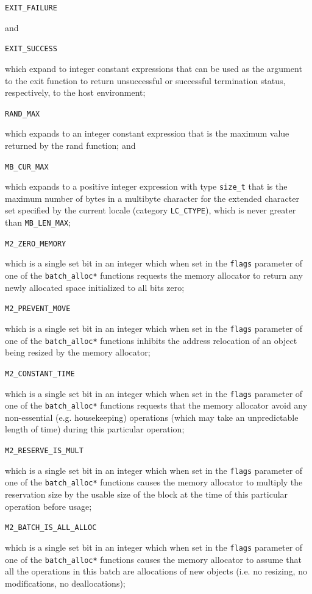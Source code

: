 \documentclass[wd]{isov2}
\begin{document}
{\begin{enumerate}
\texttt{EXIT\_FAILURE}

and

\texttt{EXIT\_SUCCESS}

which expand to integer constant expressions that can be used as the argument to the exit function to return unsuccessful or successful termination status, respectively, to the host environment;

\texttt{RAND\_MAX}

which expands to an integer constant expression that is the maximum value returned by the rand function; and

\texttt{MB\_CUR\_MAX}

which expands to a positive integer expression with type \texttt{size\_t} that is the maximum number of bytes in a multibyte character for the extended character set specified by the current locale (category \texttt{LC\_CTYPE}), which is never greater than \texttt{MB\_LEN\_MAX}\color{changed};

\texttt{M2\_ZERO\_MEMORY}

which is a single set bit in an integer which when set in the \texttt{flags} parameter of one of the \texttt{batch\_alloc*} functions requests the memory allocator to return any newly allocated space initialized to all bits zero;

\texttt{M2\_PREVENT\_MOVE}

which is a single set bit in an integer which when set in the \texttt{flags} parameter of one of the \texttt{batch\_alloc*} functions inhibits the address relocation of an object being resized by the memory allocator;

\texttt{M2\_CONSTANT\_TIME}

which is a single set bit in an integer which when set in the \texttt{flags} parameter of one of the \texttt{batch\_alloc*} functions requests that the memory allocator avoid any non-essential (e.g. housekeeping) operations (which may take an unpredictable length of time) during this particular operation;

\texttt{M2\_RESERVE\_IS\_MULT}

which is a single set bit in an integer which when set in the \texttt{flags} parameter of one of the \texttt{batch\_alloc*} functions causes the memory allocator to multiply the reservation size by the usable size of the block at the time of this particular operation before usage;

\texttt{M2\_BATCH\_IS\_ALL\_ALLOC}

which is a single set bit in an integer which when set in the \texttt{flags} parameter of one of the \texttt{batch\_alloc*} functions causes the memory allocator to assume that all the operations in this batch are allocations of new objects (i.e. no resizing, no modifications, no deallocations);


\end{enumerate}}
\end{document}
